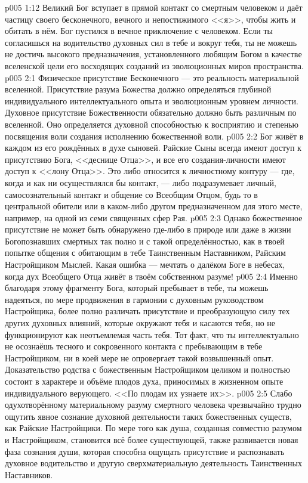 \vs p005 1:12 Великий Бог вступает в прямой контакт со смертным человеком и даёт частицу своего бесконечного, вечного и непостижимого <<я>>, чтобы жить и обитать в нём. Бог пустился в вечное приключение с человеком. Если ты согласишься на водительство духовных сил в тебе и вокруг тебя, ты не можешь не достичь высокого предназначения, установленного любящим Богом в качестве вселенской цели его восходящих созданий из эволюционных миров пространства.
\vs p005 2:1 Физическое присутствие Бесконечного --- это реальность материальной вселенной. Присутствие разума Божества должно определяться глубиной индивидуального интеллектуального опыта и эволюционным уровнем личности. Духовное присутствие Божественности обязательно должно быть различным по вселенной. Оно определяется духовной способностью к восприятию и степенью посвящения воли создания исполнению божественной воли.
\vs p005 2:2 Бог живёт в каждом из его рождённых в духе сыновей. Райские Сыны всегда имеют доступ к присутствию Бога, <<деснице Отца>>, и все его создания\hyp{}личности имеют доступ к <<лону Отца>>. Это либо относится к личностному контуру --- где, когда и как ни осуществлялся бы контакт, --- либо подразумевает личный, самосознательный контакт и общение со Всеобщим Отцом, будь то в центральной обители или в каком\hyp{}либо другом предназначенном для этого месте, например, на одной из семи священных сфер Рая.
\vs p005 2:3 Однако божественное присутствие не может быть обнаружено где\hyp{}либо в природе или даже в жизни Богопознавших смертных так полно и с такой определённостью, как в твоей попытке общения с обитающим в тебе Таинственным Наставником, Райским Настройщиком Мыслей. Какая ошибка --- мечтать о далёком Боге в небесах, когда дух Всеобщего Отца живёт в твоём собственном разуме!
\vs p005 2:4 \pc Именно благодаря этому фрагменту Бога, который пребывает в тебе, ты можешь надеяться, по мере продвижения в гармонии с духовным руководством Настройщика, более полно различать присутствие и преобразующую силу тех других духовных влияний, которые окружают тебя и касаются тебя, но не функционируют как неотъемлемая часть тебя. Тот факт, что ты интеллектуально не осознаёшь тесного и сокровенного контакта с пребывающим в тебе Настройщиком, ни в коей мере не опровергает такой возвышенный опыт. Доказательство родства с божественным Настройщиком целиком и полностью состоит в характере и объёме плодов духа, приносимых в жизненном опыте индивидуального верующего. <<По плодам их узнаете их>>.
\vs p005 2:5 Слабо одухотворённому материальному разуму смертного человека чрезвычайно трудно ощутить явное сознание духовной деятельности таких божественных существ, как Райские Настройщики. По мере того как душа, созданная совместно разумом и Настройщиком, становится всё более существующей, также развивается новая фаза сознания души, которая способна ощущать присутствие и распознавать духовное водительство и другую сверхматериальную деятельность Таинственных Наставников.
